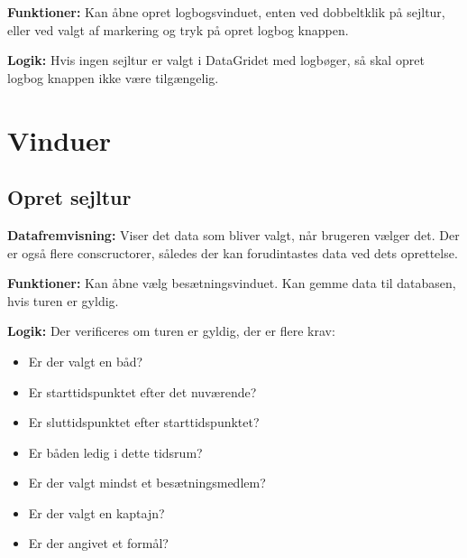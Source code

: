 \textbf{Funktioner:} 
Kan åbne opret logbogsvinduet, enten ved dobbeltklik på sejltur, eller ved valgt af markering og tryk på opret logbog knappen. 

\textbf{Logik:} 
Hvis ingen sejltur er valgt i DataGridet med logbøger, så skal opret logbog knappen ikke være tilgængelig.



\section{Vinduer}
\subsection{Opret sejltur}

\textbf{Datafremvisning:} 
Viser det data som bliver valgt, når brugeren vælger det. 
Der er også flere conscructorer, således der kan forudintastes data ved dets oprettelse.

\textbf{Funktioner:} 
Kan åbne vælg besætningsvinduet. 
Kan gemme data til databasen, hvis turen er gyldig.

\textbf{Logik:} 
Der verificeres om turen er gyldig, der er flere krav:
\begin{itemize}
    \item Er der valgt en båd?
    \item Er starttidspunktet efter det nuværende?
    \item Er sluttidspunktet efter starttidspunktet?
    \item Er båden ledig i dette tidsrum?
    \item Er der valgt mindst et besætningsmedlem?
    \item Er der valgt en kaptajn?
    \item Er der angivet et formål?
\end{itemize}

